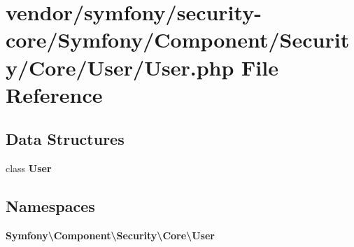 \section{vendor/symfony/security-\/core/\+Symfony/\+Component/\+Security/\+Core/\+User/\+User.php File Reference}
\label{vendor_2symfony_2security-core_2_symfony_2_component_2_security_2_core_2_user_2_user_8php}
\subsection*{Data Structures}
\begin{DoxyCompactItemize}
\item 
class {\bf User}
\end{DoxyCompactItemize}
\subsection*{Namespaces}
\begin{DoxyCompactItemize}
\item 
 {\bf Symfony\textbackslash{}\+Component\textbackslash{}\+Security\textbackslash{}\+Core\textbackslash{}\+User}
\end{DoxyCompactItemize}
